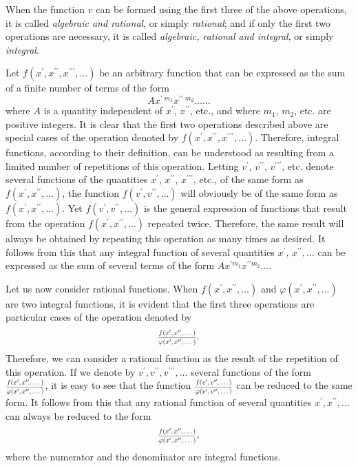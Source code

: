 \documentclass[oneside, 12 pt, leqno]{memoir}
\let\oldfrac\frac
\def\frac#1#2{\mathchoice{\text{\scalebox{.83}{${\oldfrac{#1}{#2}}$}}}{\text{\scalebox{.83}{${\displaystyle\oldfrac{#1}{#2}}$}}}{\genfrac{}{}{}{2}{#1}{#2}}{\genfrac{}{}{}{3}{#1}{#2}}}
\begin{document}
When the function \(v\) can be formed using the first three of the above operations, it is called \textit{algebraic and rational}, or simply \textit{rational}; and if only the first two operations are necessary, it is called \textit{algebraic, rational and integral}, or simply \textit{integral}.

Let \(f(x^{\prime}, x^{\prime \prime}, x^{\prime \prime \prime}, \dots)\) be an arbitrary function that can be expressed as the sum of a finite number of terms of the form
\[A x^{\prime\; m_1} x^{\prime\prime\; m_2} \dots \dots\]
where \(A\) is a quantity independent of \(x^{\prime}\), \(x^{\prime \prime}\), etc., and where \(m_1\), \(m_2\), etc. are positive integers.  It is clear that the first two operations described above are special cases of the operation denoted by \(f(x^{\prime}, x^{\prime \prime}, x^{\prime \prime \prime}, \dots)\).  Therefore, integral functions, according to their definition, can be understood as resulting from a limited number of repetitions of this operation.  Letting \(v^{\prime}\), \(v^{\prime \prime}\), \(v^{\prime \prime \prime}\), etc. denote several functions of the quantities \(x^{\prime}\), \(x^{\prime \prime}\), \(x^{\prime \prime \prime}\), etc., of the same form as \(f(x^{\prime}, x^{\prime \prime}, \dots)\), the function \(f(v^{\prime}, v^{\prime \prime}, \dots)\) will obviously be of the same form as \(f(x^{\prime}, x^{\prime \prime}, \dots)\).  Yet \(f(v^{\prime}, v^{\prime \prime}, \dots)\) is the general expression of functions that result from the operation \(f(x^{\prime}, x^{\prime \prime}, \dots)\) repeated twice.  Therefore, the same result will always be obtained by repeating this operation as many times as desired.  It follows from this that any integral function of several quantities \(x^{\prime}\), \(x^{\prime \prime}, \dots\) can be expressed as the sum of several terms of the form \(A x^{\prime m_1} x^{\prime \prime m_2} \dots\).

Let us now consider rational functions.  When \(f(x^{\prime}, x^{\prime \prime}, \dots)\) and \(\varphi(x^{\prime}, x^{\prime \prime}, \dots)\) are two integral functions, it is evident that the first three operations are particular cases of the operation denoted by
\[\frac{f(x^{\prime}, x^{\prime \prime}, \dots)}{\varphi(x^{\prime}, x^{\prime \prime}, \dots)}.\]
Therefore, we can consider a rational function as the result of the repetition of this operation. If we denote by \(v^{\prime}, v^{\prime \prime}, v^{\prime \prime \prime}, \dots\) several functions of the form \(\frac{f(x^{\prime}, x^{\prime \prime}, \dots)}{\varphi(x^{\prime}, x^{\prime \prime}, \dots)}\), it is easy to see that the function \(\frac{f(v^{\prime}, v^{\prime \prime}, \dots)}{\varphi(v^{\prime}, v^{\prime \prime}, \dots)}\) can be reduced to the same form. It follows from this that any rational function of several quantities \(x^{\prime}, x^{\prime \prime}, \dots\) can always be reduced to the form
\[\frac{f(x^{\prime}, x^{\prime \prime}, \dots)}{\varphi(x^{\prime}, x^{\prime \prime}, \dots)},\]
where the numerator and the denominator are integral functions.
\end{document}
